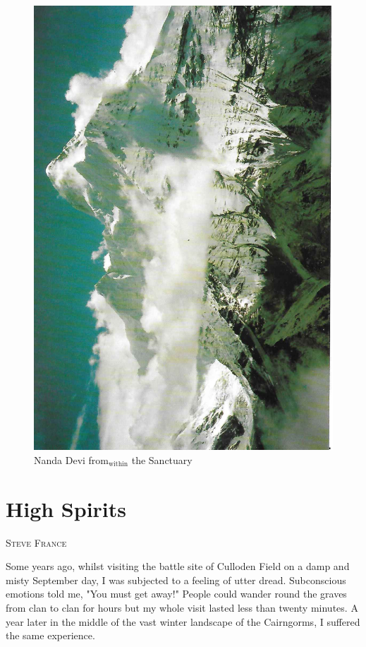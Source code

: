 \documentclass[a5paper,openany,font 10pt]{scrbook}
\makeatletter
\newcommand{\chapterauthor}[1]{%
{\parindent0pt\vspace*{-5pt}%
\linespread{1.1}\large\scshape#1%
\par\nobreak\vspace*{35pt}}
\@afterheading%
}
\makeatother
\begin{document}
\begin{figure}[htb]
\centering
\includegraphics[width=.9\linewidth]{./images/Nanda_Devi_from_within_the_Sanctuary.jpg}
\caption{\label{fig:org5196f16}
Nanda Devi from\(_{\text{within}}\) the Sanctuary}
\end{figure}

\chapter{High Spirits}
\label{sec:orgd2b7d7e}
\chapterauthor{Steve France}

Some years ago, whilst visiting the battle site of Culloden
Field on a damp and misty September day, I was subjected to a
feeling of utter dread.  Subconscious emotions told me, "You must
get away!" People could wander round the graves from clan to clan
for hours but my whole visit lasted less than twenty minutes.  A
year later in the middle of the vast winter landscape of the
Cairngorms, I suffered the same experience.
\end{document}
